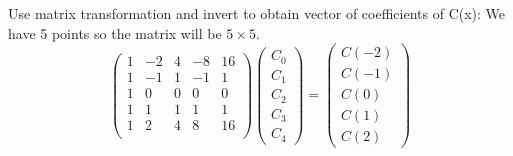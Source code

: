 \documentclass[11pt, a4paper]{article}
\begin{document}
{{{Use matrix transformation and invert to obtain vector of coefficients of C(x):
We have 5 points so the matrix will be $5\times 5$.
       \[ \begin{pmatrix}
          1 & -2 & 4 & -8 & 16 \\
          1 & -1 & 1 & -1& 1 \\
          1 & 0 & 0 & 0 & 0 \\
          1 & 1 & 1 & 1& 1 \\
          1 & 2 & 4 & 8 & 16 \\
        \end{pmatrix} 
         \begin{pmatrix}
          C_0 \\ C_1 \\ C_2 \\ C_3 \\ C_4
        \end{pmatrix} =
        \begin{pmatrix}
          C(-2) \\ C(-1) \\ C(0) \\ C(1) \\ C(2)
      \end{pmatrix} \]

}}}
\end{document}
